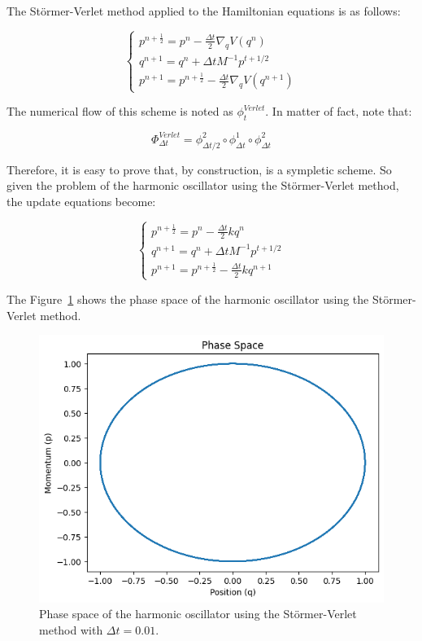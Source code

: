 \documentclass{report}
\begin{document}
The Störmer-Verlet method applied to the Hamiltonian equations is as follows:

\begin{equation}
	\begin{cases}
		p^{n + \frac{1}{2}} = p^n - \frac{\Delta t}{2} \nabla_q V(q^n) \\
		q^{n+1} = q^{n} + \Delta t M^{-1} p^{t+1/2} \\
		p^{n+1} = p^{n+\frac{1}{2}} - \frac{\Delta t}{2} \nabla_q V(q^{n+1})
	\end{cases}
	\label{eq:stormerverlet}
\end{equation}

The numerical flow of this scheme is noted as \(\phi^{Verlet}_t\). In matter of fact, note that:

\[
	\Phi^{Verlet}_{\Delta t} = \phi^2_{\Delta t/2} \circ \phi^1_{\Delta t} \circ \phi^2_{\Delta t}
\]


Therefore, it is easy to prove that, by construction, is a sympletic scheme. So given the problem of the harmonic oscillator using the Störmer-Verlet method, the update equations become:

\begin{equation}
	\begin{cases}
		p^{n + \frac{1}{2}} = p^n - \frac{\Delta t}{2} kq^n \\
		q^{n+1} = q^{n} + \Delta t M^{-1} p^{t+1/2} \\
		p^{n+1} = p^{n+\frac{1}{2}} - \frac{\Delta t}{2} kq^{n+1}
	\end{cases}
	\label{eq:stormerverletharmonic}
\end{equation}

The Figure~\ref{fig:stormerverletphase} shows the phase space of the harmonic oscillator using the Störmer-Verlet method.

\begin{figure}[H]
	\centering
	\includegraphics[width=0.5\linewidth]{./Figures/Sympletic/verletphase.png}
	\caption{Phase space of the harmonic oscillator using the Störmer-Verlet method with \(\Delta t = 0.01\).}
	\label{fig:stormerverletphase}
\end{figure}
\end{document}
